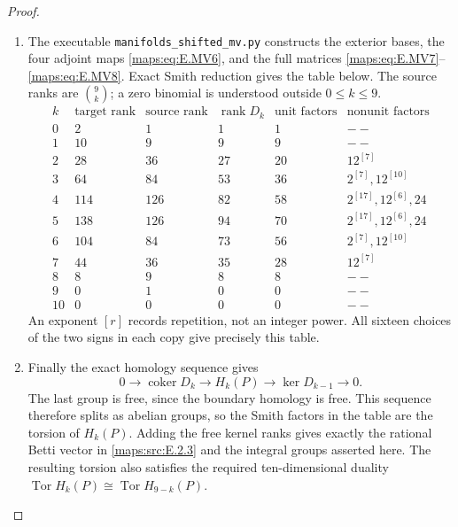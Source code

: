\begin{proof}
\begin{enumerate}[label={$\langle1\rangle$\arabic*.},leftmargin=*]
\item The executable \texttt{manifolds\_shifted\_mv.py} constructs
the exterior bases, the four adjoint maps \eqref{maps:eq:E.MV6}, and the full
matrices \eqref{maps:eq:E.MV7}--\eqref{maps:eq:E.MV8}. Exact Smith reduction gives the table
below. The source ranks are $\binom9k$; a zero binomial is
understood outside $0\leq k\leq9$.
\[
 \begin{array}{c|rrrr|l}
 k&\text{target rank}&\text{source rank}&\operatorname{rank}D_k&
       \text{unit factors}&\text{nonunit factors}\\\hline
 0&2&1&1&1&--\\
 1&10&9&9&9&--\\
 2&28&36&27&20&12^{[7]}\\
 3&64&84&53&36&2^{[7]},12^{[10]}\\
 4&114&126&82&58&2^{[17]},12^{[6]},24\\
 5&138&126&94&70&2^{[17]},12^{[6]},24\\
 6&104&84&73&56&2^{[7]},12^{[10]}\\
 7&44&36&35&28&12^{[7]}\\
 8&8&9&8&8&--\\
 9&0&1&0&0&--\\
 10&0&0&0&0&--
 \end{array}
\]
An exponent $[r]$ records repetition, not an integer power.
All sixteen choices of the two signs in each copy give precisely
this table.

\item Finally the exact homology sequence gives
\[
 0\longrightarrow\operatorname{coker}D_k
 \longrightarrow H_k(P)
 \longrightarrow\ker D_{k-1}\longrightarrow0.
\]
The last group is free, since the boundary homology is free.
This sequence therefore splits as abelian groups, so the Smith
factors in the table are the torsion of $H_k(P)$.
Adding the free kernel ranks gives exactly the rational Betti
vector in \ref{maps:src:E.2.3} and the integral groups asserted here.
The resulting torsion also satisfies the required ten-dimensional
duality $\operatorname{Tor}H_k(P)\cong
\operatorname{Tor}H_{9-k}(P)$.
\end{enumerate}
\end{proof}

